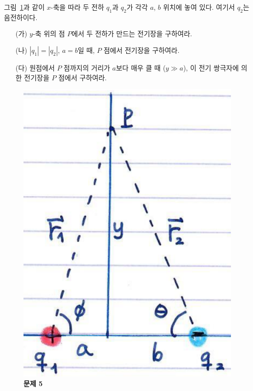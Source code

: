 \documentclass[tightenlines,floatfix,nofootinbib,superscriptaddress,fleqn]{revtex4}
\begin{document}
\newpage

그림~\ref{fig:1}과 같이 $x$-축을 따라 두 전하 $q_1$과 $q_2$가 각각
$a$, $b$ 위치에 놓여 있다. 여기서 $q_2$는 음전하이다. 
\begin{itemize}
\item[(가)] $y$-축 위의 점 $P$에서 두 전하가 만드는 전기장을
  구하여라. 
\item[(나)] $|q_1|=|q_2|$, $a=b$일 때, $P$ 점에서 전기장을 구하여라. 
\item[(다)] 원점에서 $P$ 점까지의 거리가 $a$보다 매우 클 때 ($y\gg
  a$), 이 전기 쌍극자에 의한 전기장을 $P$ 점에서 구하여라. 
\end{itemize}
\begin{figure}[htp]
  \centering
  \includegraphics[scale=0.4]{Qfig20220829-1.pdf}
  \caption{\textbf{문제 5}}
  \label{fig:1}
\end{figure}
\end{document}
